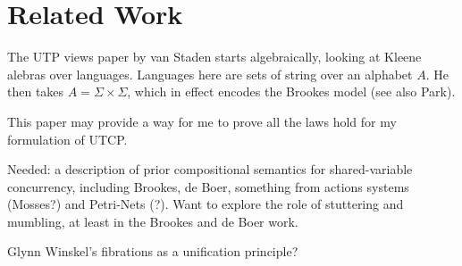 \section{Related Work}\label{sec:related}

The UTP views paper by van Staden\cite{DBLP:conf/utp/Staden14}
starts algebraically, looking at Kleene alebras over languages.
Languages here are sets of string over an alphabet $A$.
He then takes $A =\Sigma\times\Sigma$,
which in effect encodes the Brookes model\cite{DBLP:journals/iandc/Brookes96}
(see also Park\cite{conf/ac/Park79}).

This paper may provide a way for me to prove all the laws hold for
my formulation of UTCP.


Needed: a description of prior compositional semantics
for shared-variable concurrency,
including Brookes, de Boer, something from actions systems (Mosses?)
and Petri-Nets (?).
Want to explore the role of stuttering and mumbling,
at least in the Brookes and de Boer work.

Glynn Winskel's fibrations as a unification principle?
